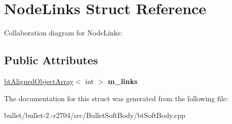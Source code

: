 \hypertarget{struct_node_links}{\section{Node\+Links Struct Reference}
\label{struct_node_links}
}


Collaboration diagram for Node\+Links\+:
\subsection*{Public Attributes}
\begin{DoxyCompactItemize}
\item 
\hypertarget{struct_node_links_a3e69c1399f17cbe7a61d64cb87e8ae4e}{\hyperlink{classbt_aligned_object_array}{bt\+Aligned\+Object\+Array}$<$ int $>$ {\bfseries m\+\_\+links}}\label{struct_node_links_a3e69c1399f17cbe7a61d64cb87e8ae4e}

\end{DoxyCompactItemize}


The documentation for this struct was generated from the following file\+:\begin{DoxyCompactItemize}
\item 
bullet/bullet-\/2.-\/r2704/src/\+Bullet\+Soft\+Body/bt\+Soft\+Body.\+cpp\end{DoxyCompactItemize}

